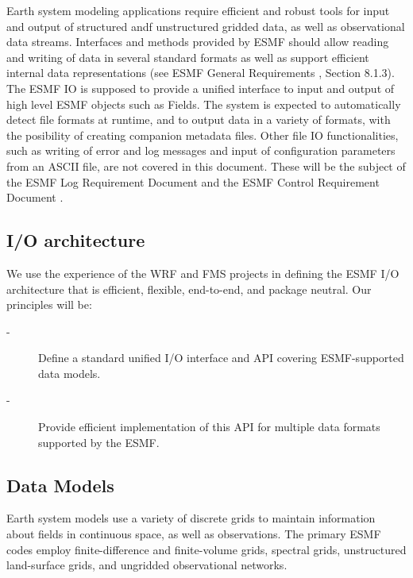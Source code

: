 

Earth system modeling applications require efficient and robust tools
for input and output of structured andf unstructured gridded data, as
well as observational data streams.  Interfaces and methods provided
by ESMF should allow reading and writing of data in several standard
formats as well as support efficient internal data representations
(see ESMF General Requirements \cite{ESMFGenReq}, Section 8.1.3). 
The ESMF IO is supposed to provide a unified interface to input and output 
of high level ESMF objects such as Fields.  The system is expected to 
automatically detect file formats at runtime, and to output data in a variety 
of formats, with the posibility of creating companion metadata files. Other 
file IO functionalities, such as writing of error and log messages and input 
of configuration parameters from an ASCII file, are not covered in this
document. 
These will be the subject of the ESMF Log Requirement Document and the ESMF 
Control Requirement Document \cite{ESMF-Log-Req, ESMF-Control-Req}.


\subsection{I/O architecture}

We use the experience of the WRF \cite{WRF-Software} and FMS 
\cite{Balaji_Parallel_IO_2000}  projects in defining the 
ESMF I/O architecture that is efficient, flexible, end-to-end, and package 
neutral. Our principles will be:

\begin{description}
\item[-] Define a standard unified I/O interface and API covering 
         ESMF-supported data models.
\item[-] Provide efficient implementation of this API for multiple data 
         formats supported by the ESMF. 
\end{description}



\subsection{Data Models}

Earth system models use a variety of discrete grids to maintain information 
about fields in continuous space, as well as observations. The primary ESMF 
codes employ finite-difference and finite-volume grids, spectral grids, 
unstructured land-surface grids, and ungridded observational networks.

